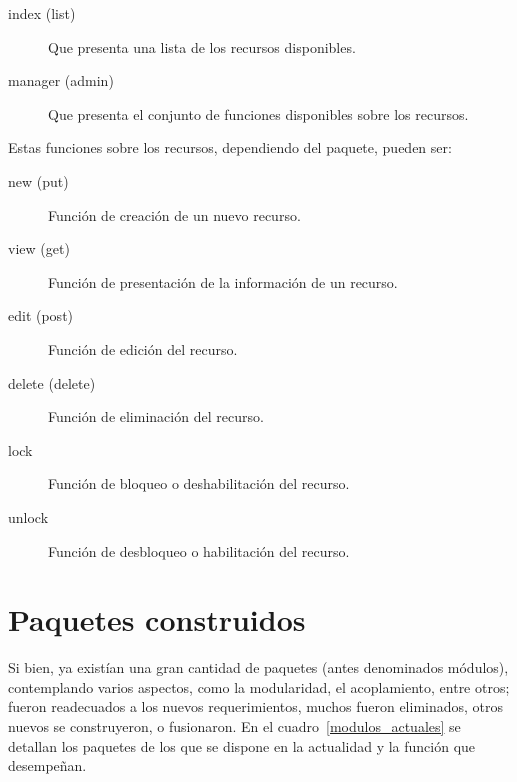 \begin{description}
\item [index (list)] Que presenta una lista de los recursos disponibles.
\item [manager (admin)] Que presenta el conjunto de funciones disponibles sobre los recursos.
\end{description}

Estas funciones sobre los recursos, dependiendo del paquete, pueden ser:

\begin{description}
\item [new (put)] Función de creación de un nuevo recurso.
\item [view (get)] Función de presentación de la información de un recurso.
\item [edit (post)] Función de edición del recurso.
\item [delete (delete)] Función de eliminación del recurso.
\item [lock] Función de bloqueo o deshabilitación del recurso.
\item [unlock] Función de desbloqueo o habilitación del recurso.
\end{description}

\section{Paquetes construidos}
Si bien, ya existían una gran cantidad de paquetes (antes denominados módulos), contemplando varios aspectos, como la modularidad, el acoplamiento, entre otros; fueron readecuados a los nuevos requerimientos, muchos fueron eliminados, otros nuevos se construyeron, o fusionaron. En el cuadro~\ref{modulos_actuales} se detallan los paquetes de los que se dispone en la actualidad y la función que desempeñan.

